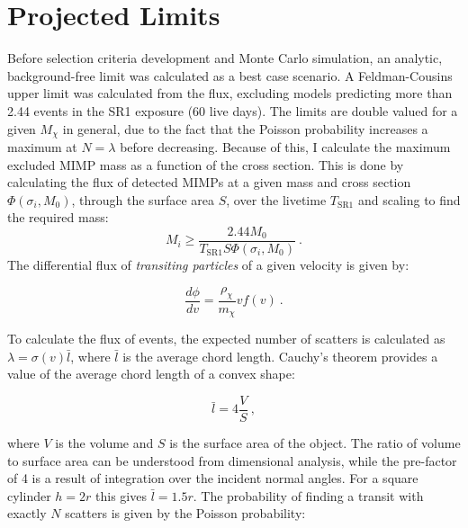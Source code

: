 \section{Projected Limits}
\label{sec:projected_limits}
Before selection criteria development and Monte Carlo simulation, an analytic, background-free limit was calculated as a best case scenario.
A Feldman-Cousins\cite{feldman_unified_1998} upper limit was calculated from the  flux, excluding models predicting more than 2.44 events in the SR1 exposure (60 live days\cite{aalbers_first_2022}).
The limits are double valued for a given $M_\chi$ in general, due to the fact that the Poisson probability increases a maximum at $N=\lambda$ before decreasing.
Because of this, I calculate the maximum excluded MIMP mass as a function of the cross section.
This is done by calculating the flux of detected MIMPs at a given mass and cross section $\Phi(\sigma_i, M_0)$, through the surface area $S$, over the livetime $T_{\text{SR1}}$ and scaling to find the required mass:
\begin{equation}
    M_i \geq \frac{2.44 M_0 }{T_{\text{SR1}}S  \Phi (\sigma_i, M_0)} ~.
\end{equation}
\noindent
The differential flux of \textit{transiting particles} of a given velocity is given by:

\begin{equation}
    \frac{d \phi}{d v} = \frac{\rho_\chi}{m_\chi}v f(v) ~.
\end{equation}

To calculate the flux of events, the expected number of scatters is calculated as $\lambda = \sigma(v) \bar l$, where $\bar l$ is the average chord length.
Cauchy's theorem\cite{reuss_cauchys_2018} provides a value of the average chord length of a convex shape:

\begin{equation}
    \bar l = 4 \frac V S~,
\end{equation}

where $V$ is the volume and $S$ is the surface area of the object.
The ratio of volume to surface area can be understood from dimensional analysis, while the pre-factor of 4 is a result of integration over the incident normal angles.
For a square cylinder $h=2r$ this gives $\bar l = 1.5 r$.
The probability of finding a transit with exactly $N$ scatters is given by the Poisson probability: 

